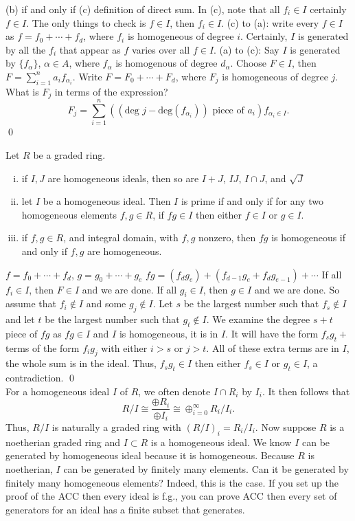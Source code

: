 \pf (b) if and only if (c) definition of direct sum. In (c), note that all $f_i \in I$ certainly $f \in I$. The only things to check is $f \in I$, then $f_i \in I$. (c) to (a): write every $f \in I$ as $f= f_0 + \cdots + f_d$, where $f_i$ is homogeneous of degree $i$. Certainly, $I$ is generated by all the $f_i$ that appear as $f$ varies over all $f \in I$. (a) to (c): Say $I$ is generated by $\{f_\alpha\}$, $\alpha \in A$, where $f_\alpha$ is homogenous of degree $d_\alpha$. Choose $F \in I$, then $F= \sum_{i=1}^n a_i f_{\alpha_i}$. Write $F= F_0 + \cdots + F_d$, where $F_j$ is homogeneous of degree $j$. What is $F_j$ in terms of the expression?
	\[
	F_j= \sum_{i=1}^n ((\text{deg }j - \text{deg}(f_{\alpha_i})) \text{ piece of }a_i) f_{\alpha_i \in I}. 
	\] \qed \\


\begin{prop}
Let $R$ be a graded ring.
\begin{enumerate}[(i)]
\item if $I, J$ are homogeneous ideals, then so are $I+J$, $IJ$, $I \cap J$, and $\sqrt{J}$
\item let $I$ be a homogeneous ideal. Then $I$ is prime if and only if for any two homogeneous elements $f,g \in R$, if $fg \in I$ then either $f \in I$ or $g \in I$. 
\item if $f,g \in R$, and integral domain, with $f,g$ nonzero, then $fg$ is homogeneous if and only if $f,g$ are homogeneous. 
\end{enumerate}
\end{prop}


\pf 

$f= f_0 + \cdots + f_d$, $g= g_0 + \cdots+ g_e$
$fg= (f_dg_e) + (f_{d-1}g_e+ f_dg_{e-1}) + \cdots$
If all $f_i \in I$, then $F \in I$ and we are done.
If all $g_i \in I$, then $g \in I$ and we are done.
So assume that $f_i \notin I$ and some $g_j \notin I$.
Let $s$ be the largest number such that $f_s \notin I$ and let $t$ be the largest number such that $g_t \notin I$. We examine the degree $s+t$ piece of $fg$ as $fg \in I$ and $I$ is homogeneous, it is in $I$. It will have the form $f_sg_t+$ terms of the form $f_ig_j$ with either $i>s$ or $j>t$. All of these extra terms are in $I$, the whole sum is in the ideal. Thus, $f_sg_t \in I$ then either $f_s \in I$ or $g_t \in I$, a contradiction. \qed \\


For a homogeneous ideal $I$ of $R$, we often denote $I \cap R_i$ by $I_i$. It then follows that 
	\[
	R/I \cong \dfrac{\oplus R_i}{\oplus I_i} \cong \oplus_{i=0}^\infty R_i/I_i.
	\]
Thus, $R/I$ is naturally a graded ring with $(R/I)_i = R_i/I_i$. Now suppose $R$ is a noetherian graded ring and $I \subset R$ is a homogeneous ideal. We know $I$ can be generated by homogeneous ideal because it is homogeneous. Because $R$ is noetherian, $I$ can be generated by finitely many elements. Can it be generated by finitely many homogeneous elements? Indeed, this is the case. If you set up the proof of the ACC then every ideal is f.g., you can prove ACC then every set of generators for an ideal has a finite subset that generates. 



